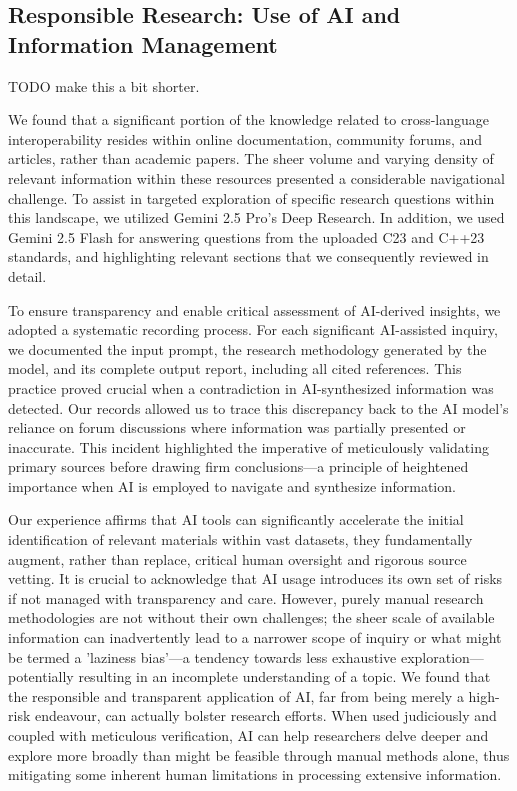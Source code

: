 \subsection{Responsible Research: Use of AI and Information Management}
TODO make this a bit shorter.

We found that a significant portion of the knowledge related to cross-language interoperability resides within online documentation, community forums, and articles, rather than academic papers. The sheer volume and varying density of relevant information within these resources presented a considerable navigational challenge. To assist in targeted exploration of specific research questions within this landscape, we utilized Gemini 2.5 Pro's Deep Research. In addition, we used Gemini 2.5 Flash for answering questions from the uploaded C23 and C++23 standards, and highlighting relevant sections that we consequently reviewed in detail.

To ensure transparency and enable critical assessment of AI-derived insights, we adopted a systematic recording process. For each significant AI-assisted inquiry, we documented the input prompt, the research methodology generated by the model, and its complete output report, including all cited references. This practice proved crucial when a contradiction in AI-synthesized information was detected. Our records allowed us to trace this discrepancy back to the AI model's reliance on forum discussions where information was partially presented or inaccurate. This incident highlighted the imperative of meticulously validating primary sources before drawing firm conclusions—a principle of heightened importance when AI is employed to navigate and synthesize information.

Our experience affirms that AI tools can significantly accelerate the initial identification of relevant materials within vast datasets, they fundamentally augment, rather than replace, critical human oversight and rigorous source vetting. It is crucial to acknowledge that AI usage introduces its own set of risks if not managed with transparency and care. However, purely manual research methodologies are not without their own challenges; the sheer scale of available information can inadvertently lead to a narrower scope of inquiry or what might be termed a 'laziness bias'—a tendency towards less exhaustive exploration—potentially resulting in an incomplete understanding of a topic. We found that the responsible and transparent application of AI, far from being merely a high-risk endeavour, can actually bolster research efforts. When used judiciously and coupled with meticulous verification, AI can help researchers delve deeper and explore more broadly than might be feasible through manual methods alone, thus mitigating some inherent human limitations in processing extensive information.

